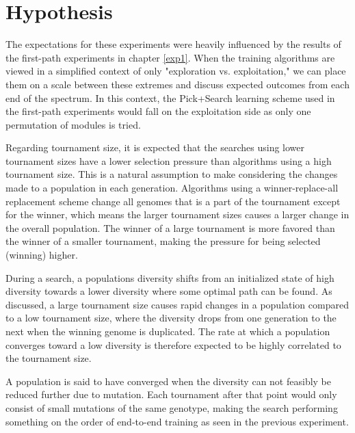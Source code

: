 \section{Hypothesis}
\label{exp2:hypothesis}
The expectations for these experiments were heavily influenced by the results of the first-path experiments in chapter \ref{exp1}. When the training algorithms are viewed in a simplified context of only "exploration vs. exploitation," we can place them on a scale between these extremes and discuss expected outcomes from each end of the spectrum. In this context, the Pick+Search learning scheme used in the first-path experiments would fall on the exploitation side as only one permutation of modules is tried.

Regarding tournament size, it is expected that the searches using lower tournament sizes have a lower selection pressure than algorithms using a high tournament size. This is a natural assumption to make considering the changes made to a population in each generation. Algorithms using a winner-replace-all replacement scheme change all genomes that is a part of the tournament except for the winner, which means the larger tournament sizes causes a larger change in the overall population. The winner of a large tournament is more favored than the winner of a smaller tournament, making the pressure for being selected (winning) higher. 

During a search, a populations diversity shifts from an initialized state of high diversity towards a lower diversity where some optimal path can be found. As discussed, a large tournament size causes rapid changes in a population compared to a low tournament size, where the diversity drops from one generation to the next when the winning genome is duplicated. The rate at which a population converges toward a low diversity is therefore expected to be highly correlated to the tournament size.

A population is said to have converged when the diversity can not feasibly be reduced further due to mutation. Each tournament after that point would only consist of small mutations of the same genotype, making the search performing something on the order of end-to-end training as seen in the previous experiment. 


